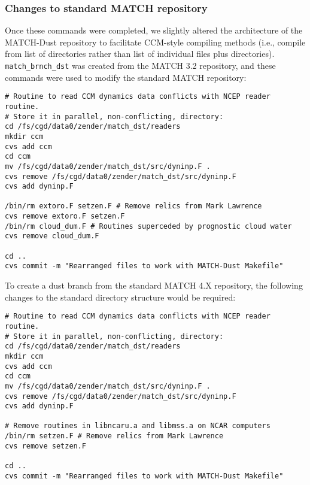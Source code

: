 \documentclass[12pt,twoside]{article}
\begin{document}
\subsubsection[Repository changes]{Changes to standard MATCH repository}
Once these commands were completed, we slightly altered the
architecture of the MATCH-Dust repository to facilitate CCM-style
compiling methods (i.e., compile from list of directories rather than
list of individual files plus directories).
\verb'match_brnch_dst' was created from the MATCH 3.2 repository,
and these commands were used to modify the standard MATCH repository:
\begin{verbatim}
# Routine to read CCM dynamics data conflicts with NCEP reader routine.
# Store it in parallel, non-conflicting, directory:
cd /fs/cgd/data0/zender/match_dst/readers
mkdir ccm
cvs add ccm
cd ccm
mv /fs/cgd/data0/zender/match_dst/src/dyninp.F .
cvs remove /fs/cgd/data0/zender/match_dst/src/dyninp.F
cvs add dyninp.F

/bin/rm extoro.F setzen.F # Remove relics from Mark Lawrence
cvs remove extoro.F setzen.F
/bin/rm cloud_dum.F # Routines superceded by prognostic cloud water
cvs remove cloud_dum.F

cd ..
cvs commit -m "Rearranged files to work with MATCH-Dust Makefile"
\end{verbatim}
To create a dust branch from the standard MATCH 4.X repository, the
following changes to the standard directory structure would be
required: 
\begin{verbatim}
# Routine to read CCM dynamics data conflicts with NCEP reader routine.
# Store it in parallel, non-conflicting, directory:
cd /fs/cgd/data0/zender/match_dst/readers
mkdir ccm
cvs add ccm
cd ccm
mv /fs/cgd/data0/zender/match_dst/src/dyninp.F .
cvs remove /fs/cgd/data0/zender/match_dst/src/dyninp.F
cvs add dyninp.F

# Remove routines in libncaru.a and libmss.a on NCAR computers
/bin/rm setzen.F # Remove relics from Mark Lawrence
cvs remove setzen.F

cd ..
cvs commit -m "Rearranged files to work with MATCH-Dust Makefile"
\end{verbatim}
\end{document}
